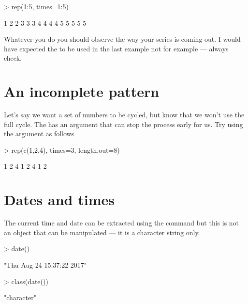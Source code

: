 \begin{Schunk}
\begin{Sinput}
> rep(1:5, times=1:5) 
\end{Sinput}
\begin{Soutput}
 [1] 1 2 2 3 3 3 4 4 4 4 5 5 5 5 5
\end{Soutput}
\end{Schunk}

Whatever you do you should observe the way your series is coming out. I would have expected the  to be used in the last example not  for example --- always check. 
 
\section{An incomplete pattern} 
 
Let's say we want a set of numbers to be cycled, but know that we won't use the full cycle. The  has an argument that can stop the process early for us. Try using the  argument as follows 

\begin{Schunk}
\begin{Sinput}
> rep(c(1,2,4), times=3, length.out=8) 
\end{Sinput}
\begin{Soutput}
[1] 1 2 4 1 2 4 1 2
\end{Soutput}
\end{Schunk}

 
 
\section{Dates and times} 
 
The current time and date can be extracted using the  command but this is not an object that can be manipulated --- it is a character string only. 

\begin{Schunk}
\begin{Sinput}
> date() 
\end{Sinput}
\begin{Soutput}
[1] "Thu Aug 24 15:37:22 2017"
\end{Soutput}
\begin{Sinput}
> class(date()) 
\end{Sinput}
\begin{Soutput}
[1] "character"
\end{Soutput}
\end{Schunk}

